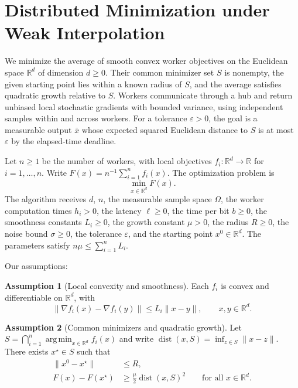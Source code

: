 \documentclass[10pt]{article}
\theoremstyle{definition}
\newtheorem{assumption}{Assumption}
\begin{document}
\section*{Distributed Minimization under Weak Interpolation}
We minimize the average of smooth convex worker objectives on the Euclidean space $\mathbb{R}^d$ of dimension $d\geq 0$. Their common minimizer set $S$ is nonempty, the given starting point lies within a known radius of $S$, and the average satisfies quadratic growth relative to $S$. Workers communicate through a hub and return unbiased local stochastic gradients with bounded variance, using independent samples within and across workers. For a tolerance $\varepsilon>0$, the goal is a measurable output $\bar{x}$ whose expected squared Euclidean distance to $S$ is at most $\varepsilon$ by the elapsed-time deadline.

Let $n\geq 1$ be the number of workers, with local objectives $f_i:\mathbb{R}^d\to\mathbb{R}$ for $i=1,\ldots,n$. Write $F(x)=n^{-1}\sum_{i=1}^n f_i(x)$. The optimization problem is
\[
\min_{x\in\mathbb{R}^d} F(x).
\]
The algorithm receives $d$, $n$, the measurable sample space $\Omega$, the worker computation times $h_i>0$, the latency $\ell\geq 0$, the time per bit $b\geq 0$, the smoothness constants $L_i\geq 0$, the growth constant $\mu>0$, the radius $R\geq 0$, the noise bound $\sigma\geq 0$, the tolerance $\varepsilon$, and the starting point $x^0\in\mathbb{R}^d$. The parameters satisfy $n\mu\leq\sum_{i=1}^n L_i$.

Our assumptions:
\begin{assumption}[Local convexity and smoothness]
Each $f_i$ is convex and differentiable on $\mathbb{R}^d$, with
\[
\|\nabla f_i(x)-\nabla f_i(y)\|\leq L_i\|x-y\|,
\qquad x,y\in\mathbb{R}^d.
\]
\end{assumption}

\begin{assumption}[Common minimizers and quadratic growth]
Let $S=\bigcap_{i=1}^n\operatorname*{arg\,min}_{x\in\mathbb{R}^d}f_i(x)$ and write $\operatorname{dist}(x,S)=\inf_{z\in S}\|x-z\|$. There exists $x^\star\in S$ such that
\[
\begin{aligned}
\|x^0-x^\star\|&\leq R,\\
F(x)-F(x^\star)&\geq \frac{\mu}{2}\operatorname{dist}(x,S)^2
\qquad\text{for all }x\in\mathbb{R}^d.
\end{aligned}
\]
\end{assumption}
\end{document}
